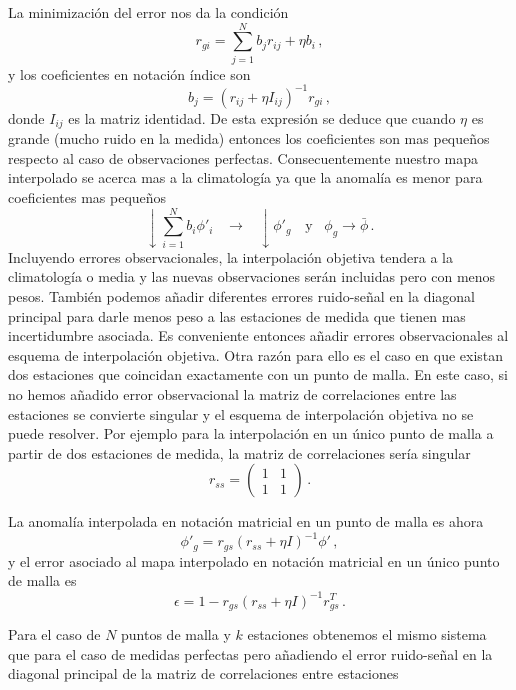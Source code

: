 \documentclass[
]{agujournal2019}
\begin{document}
La minimización del error nos da la condición
\[r_{gi}=\sum\limits^N_{j=1}b_j r_{ij}+\eta b_i\,,\] y los coeficientes
en notación índice son \[b_j=(r_{ij} + \eta I_{ij})^{-1}r_{gi}\,,\]
donde \(I_{ij}\) es la matriz identidad. De esta expresión se deduce que
cuando \(\eta\) es grande (mucho ruido en la medida) entonces los
coeficientes son mas pequeños respecto al caso de observaciones
perfectas. Consecuentemente nuestro mapa interpolado se acerca mas a la
climatología ya que la anomalía es menor para coeficientes mas pequeños
\[\downarrow \sum\limits^N_{i=1}b_i\phi'_i \,\,\,\,\,\rightarrow \,\,\,\,\,\downarrow\phi'_g\,\,\,\,\,\,\text{y}\,\,\,\,\,\phi_g\rightarrow\bar{\phi}\,.\]
Incluyendo errores observacionales, la interpolación objetiva tendera a
la climatología o media y las nuevas observaciones serán incluidas pero
con menos pesos. También podemos añadir diferentes errores ruido-señal
en la diagonal principal para darle menos peso a las estaciones de
medida que tienen mas incertidumbre asociada. Es conveniente entonces
añadir errores observacionales al esquema de interpolación objetiva.
Otra razón para ello es el caso en que existan dos estaciones que
coincidan exactamente con un punto de malla. En este caso, si no hemos
añadido error observacional la matriz de correlaciones entre las
estaciones se convierte singular y el esquema de interpolación objetiva
no se puede resolver. Por ejemplo para la interpolación en un único
punto de malla a partir de dos estaciones de medida, la matriz de
correlaciones sería singular \[r_{ss}=
       \left(\begin{array}{cc}
  1 & 1 \\
  1 & 1
     \end{array}\right)\,.\]

La anomalía interpolada en notación matricial en un punto de malla es
ahora \[\phi'_g=r_{gs}(r_{ss}+\eta I)^{-1}\phi'\,,\] y el error asociado
al mapa interpolado en notación matricial en un único punto de malla es
\[\epsilon=1-r_{gs}(r_{ss}+\eta I)^{-1}r^T_{gs}\,.\]

Para el caso de \(N\) puntos de malla y \(k\) estaciones obtenemos el
mismo sistema que para el caso de medidas perfectas pero añadiendo el
error ruido-señal en la diagonal principal de la matriz de correlaciones
entre estaciones
\end{document}

